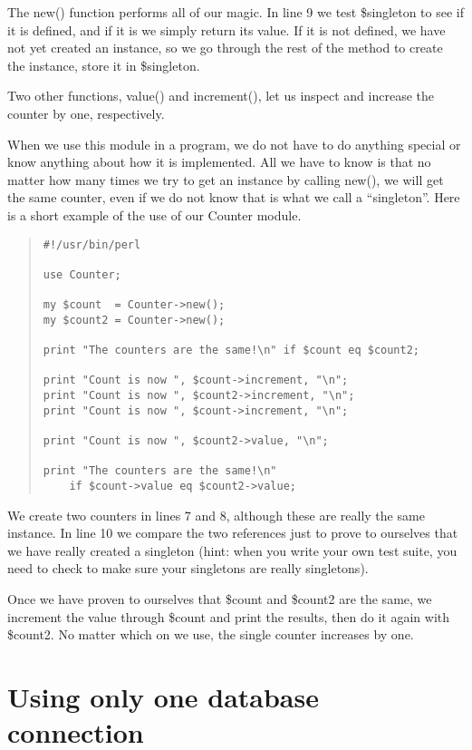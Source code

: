 The new() function performs all of our magic.  In line 9 we test
\$singleton to see if it is defined, and if it is we simply return
its value.  If it is not defined, we have not yet created an instance,
so we go through the rest of the method to create the instance, 
store it in \$singleton.

Two other functions, value() and increment(), let us inspect and
increase the counter by one, respectively.

When we use this module in a program, we do not have to do anything
special or know anything about how it is implemented.  All we have
to know is that no matter how many times we try to get an instance
by calling new(), we will get the same counter, even
if we do not know that is what we call a ``singleton''.  Here is 
a short example of the use of our Counter module.

\begin{quote}    
\begin{verbatim}
#!/usr/bin/perl

use Counter;

my $count  = Counter->new();
my $count2 = Counter->new();

print "The counters are the same!\n" if $count eq $count2;

print "Count is now ", $count->increment, "\n";
print "Count is now ", $count2->increment, "\n";
print "Count is now ", $count->increment, "\n";

print "Count is now ", $count2->value, "\n";

print "The counters are the same!\n" 
    if $count->value eq $count2->value;
\end{verbatim}
\end{quote}    

We create two counters in lines 7 and 8, although these are really
the same instance.  In line 10 we compare the two references just to
prove to ourselves that we have really created a singleton (hint:
when you write your own test suite, you need to check to make sure
your singletons are really singletons).


Once we have proven to ourselves that \$count and \$count2 are the
same, we increment the value through \$count and print the results, then do 
it again with \$count2.  No matter which on we use, the single counter 
increases by one.

    \section{Using only one database connection}

